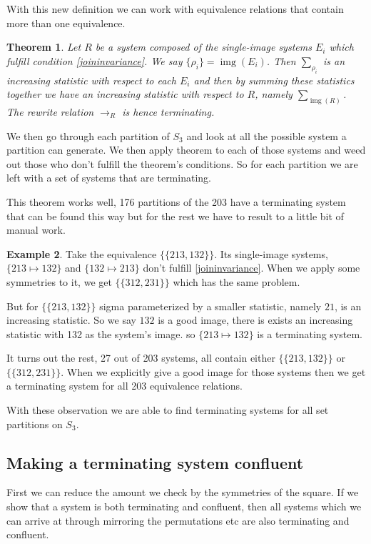 \documentclass[a4paper, 11pt, english]{article}
\newcommand{\patternrule}{ \mapsto \!}
\newtheorem{theorem}{Theorem}[section]
\theoremstyle{definition}
\newtheorem{example}[theorem]{Example}
\newcommand{\Sym}{S}
\DeclareMathOperator{\img}{img}
\begin{document}
With this new definition we can work with equivalence relations that contain more than one
equivalence.

\begin{theorem}
    Let $R$ be a system composed of the single-image systems $E_i$ which fulfill
    condition \eqref{joininvariance}. We say $\{\rho_i\} = \img(E_i)$. Then
    $\sum\nolimits_{\rho_i}$ is an increasing statistic with respect to each
    $E_i$ and then by summing these statistics together we have an increasing
    statistic with respect to $R$, namely $\sum_{\img(R)}$.  The rewrite
    relation $\to_R$ is hence terminating.
\end{theorem}

We then go through each partition of $\Sym_3$ and look at all the possible
system a partition can generate. We then apply theorem to each of those systems
and weed out those who don't fulfill the theorem's conditions. So for each
partition we are left with a set of systems that are terminating.

This theorem works well, 176 partitions of the 203 have a terminating system
that can be found this way but for the rest we have to result to a little bit of
manual work.

\begin{example}
    Take the equivalence $\{ \{ 213, 132 \} \}$. Its single-image systems,
    ${\{ 213 \patternrule 132 \}}$ and ${\{ 132 \patternrule 213 \}}$
    don't fulfill \eqref{joininvariance}.
    When we apply some symmetries to it, we get $\{ \{ 312, 231 \} \}$ which has the same problem.

    But for $\{ \{ 213, 132 \} \}$ sigma parameterized by a smaller statistic, namely $21$, is an
    increasing statistic. So we say $132$ is a good image, there is exists an
    increasing statistic with 132 as the system's image.
    so $\{ 213 \patternrule 132 \}$ is a terminating system.
\end{example}

It turns out the rest, 27 out of 203 systems, all contain either $\{ \{ 213, 132
\} \}$ or $\{ \{ 312, 231 \} \}$. When we explicitly give a good image for those
systems then we get a terminating system for all 203 equivalence relations.

With these observation we are able to find terminating systems for all set
partitions on $\Sym_3$.

\subsection{Making a terminating system confluent}
First we can reduce the amount we check by the symmetries of the square.
If we show that a system is both terminating and confluent, then all systems
which we can arrive at through mirroring the permutations etc are also
terminating and confluent.
\end{document}
